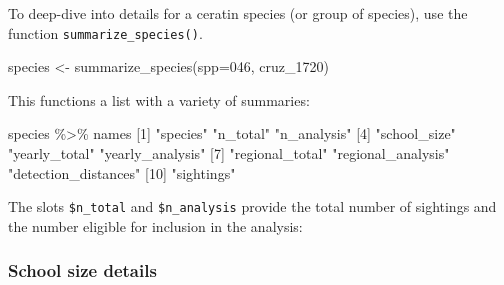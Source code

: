 \documentclass[
]{book}
\newenvironment{Shaded}{\begin{snugshade}}{\end{snugshade}}
\newcommand{\AttributeTok}[1]{\textcolor[rgb]{0.77,0.63,0.00}{#1}}
\newcommand{\DecValTok}[1]{\textcolor[rgb]{0.00,0.00,0.81}{#1}}
\newcommand{\FunctionTok}[1]{\textcolor[rgb]{0.00,0.00,0.00}{#1}}
\newcommand{\NormalTok}[1]{#1}
\newcommand{\OtherTok}[1]{\textcolor[rgb]{0.56,0.35,0.01}{#1}}
\newcommand{\SpecialCharTok}[1]{\textcolor[rgb]{0.00,0.00,0.00}{#1}}
\newcommand{\StringTok}[1]{\textcolor[rgb]{0.31,0.60,0.02}{#1}}
\begin{document}
To deep-dive into details for a ceratin species (or group of species), use the function \texttt{summarize\_species()}.

\begin{Shaded}
\begin{Highlighting}[]
\NormalTok{species }\OtherTok{\textless{}{-}} \FunctionTok{summarize\_species}\NormalTok{(}\AttributeTok{spp=}\StringTok{\textquotesingle{}046\textquotesingle{}}\NormalTok{, cruz\_1720)}
\end{Highlighting}
\end{Shaded}

This functions a list with a variety of summaries:

\begin{Shaded}
\begin{Highlighting}[]
\NormalTok{species }\SpecialCharTok{\%\textgreater{}\%}\NormalTok{ names}
\NormalTok{ [}\DecValTok{1}\NormalTok{] }\StringTok{"species"}             \StringTok{"n\_total"}             \StringTok{"n\_analysis"}         
\NormalTok{ [}\DecValTok{4}\NormalTok{] }\StringTok{"school\_size"}         \StringTok{"yearly\_total"}        \StringTok{"yearly\_analysis"}    
\NormalTok{ [}\DecValTok{7}\NormalTok{] }\StringTok{"regional\_total"}      \StringTok{"regional\_analysis"}   \StringTok{"detection\_distances"}
\NormalTok{[}\DecValTok{10}\NormalTok{] }\StringTok{"sightings"}          
\end{Highlighting}
\end{Shaded}

The slots \texttt{\$n\_total} and \texttt{\$n\_analysis} provide the total number of sightings and the number eligible for inclusion in the analysis:

\begin{Shaded}
\end{Shaded}

\hypertarget{school-size-details}{%
\subsubsection*{School size details}\label{school-size-details}}
\end{document}
